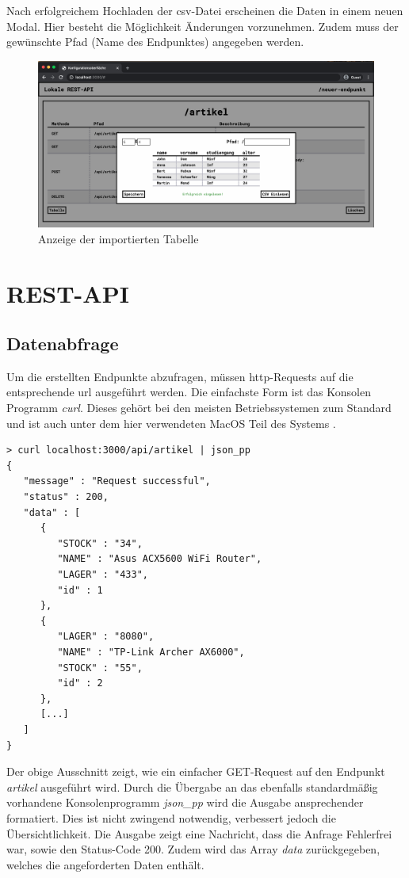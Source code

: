 Nach erfolgreichem Hochladen der \gls{csv}-Datei erscheinen die Daten in einem neuen Modal. Hier besteht die Möglichkeit Änderungen vorzunehmen. Zudem muss der gewünschte Pfad (Name des Endpunktes) angegeben werden.

\begin{figure}[H]
    \centering
    \includegraphics[width=15cm]{figures/hb_7.png}    %
    \caption{Anzeige der importierten Tabelle}
    \label{fig:hb_7}
\end{figure}

\newpage
\section{REST-API}

\subsection{Datenabfrage}

Um die erstellten Endpunkte abzufragen, müssen \gls{http}-Requests auf die entsprechende \gls{url} ausgeführt werden. Die einfachste Form ist das Konsolen Programm \textit{curl}. Dieses gehört bei den meisten Betriebssystemen zum Standard und ist auch unter dem hier verwendeten MacOS Teil des Systems \cite{DanielStenbergandContributers.2020}.

\begin{verbatim}
> curl localhost:3000/api/artikel | json_pp
{
   "message" : "Request successful",
   "status" : 200,
   "data" : [
      {
         "STOCK" : "34",
         "NAME" : "Asus ACX5600 WiFi Router",
         "LAGER" : "433",
         "id" : 1
      },
      {
         "LAGER" : "8080",
         "NAME" : "TP-Link Archer AX6000",
         "STOCK" : "55",
         "id" : 2
      },
      [...]
   ]
}
\end{verbatim}

Der obige Ausschnitt zeigt, wie ein einfacher GET-Request auf den Endpunkt \textit{artikel} ausgeführt wird.
Durch die Übergabe an das ebenfalls standardmäßig vorhandene Konsolenprogramm \textit{json\_pp} wird die Ausgabe ansprechender formatiert. Dies ist nicht zwingend notwendig, verbessert jedoch die Übersichtlichkeit. Die Ausgabe zeigt eine Nachricht, dass die Anfrage Fehlerfrei war, sowie den Status-Code 200. Zudem wird das Array \textit{data} zurückgegeben, welches die angeforderten Daten enthält.

